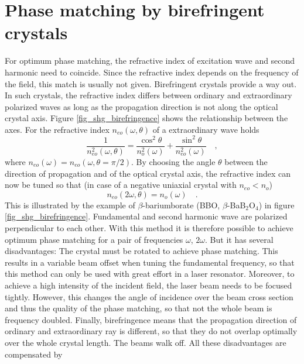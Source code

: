 \section{Phase matching by birefringent crystals}


For optimum phase matching, the refractive index of
excitation wave and second harmonic need to coincide. Since the
refractive index  depends on the frequency of the field, this
match is  usually not given. 
Birefringent crystals provide a way out. In such crystals, the refractive index differs  
 between ordinary and extraordinary
polarized waves as long as the propagation direction is not along the
optical crystal axis. Figure
\ref{fig_shg_birefringence} shows the relationship between
the axes. For the refractive index $n_{eo}(\omega, \theta)$ of a
extraordinary wave holds
\begin{equation}
  \frac{1}{n_{eo}^2(\omega, \theta)} = \frac{\cos^2
  \theta}{n_{o}^2(\omega)}+ \frac{\sin^2 \theta}{n_{eo}^2(\omega)} \quad
  , \label{eq:shg_neo}
\end{equation}
where $n_{eo}(\omega) = n_{eo}(\omega, \theta = \pi/2)$. 
By choosing the 
angle $\theta$ between the direction of propagation and
of the optical crystal axis, the refractive index can now be tuned
so that (in case of a negative uniaxial crystal with
$n_{eo} < n_o$)
\begin{equation}
  n_{eo}(2 \omega, \theta) = n_o(\omega) \quad.
\end{equation}
This is illustrated by the example of $\beta$-bariumborate (BBO,
$\beta$-BaB$_2$O$_4$) in figure
\ref{fig_shg_birefringence}. Fundamental  and
second harmonic  wave are polarized perpendicular to each other. With
this method it is therefore possible to achieve optimum phase matching for
a pair of frequencies $\omega$, $2\omega$. But it 
has several disadvantages: The crystal must be rotated
to achieve phase matching. This results in a variable beam
offset
when tuning the fundamental frequency, so that this method can only be used with great effort in a laser
resonator. Moreover, to achieve a high intensity of the incident field, the laser beam
needs to be focused tightly. However, this changes the angle of incidence over
the beam cross section and thus the quality of the
phase matching, so that not the whole beam is frequency doubled. Finally, birefringence means that the propagation direction of  ordinary and  extraordinary ray is different, so that they do not overlap optimally over the whole crystal length. The beams walk off.
All these disadvantages are compensated by
